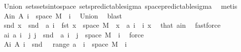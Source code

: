 \begin{isabellebody}
\ Union{\isacharparenleft}{\kern0pt}{}{\isacharparenright}{\kern0pt}\ sets{\isachardot}{\kern0pt}sets{\isacharunderscore}{\kern0pt}into{\isacharunderscore}{\kern0pt}space\ sets{\isacharunderscore}{\kern0pt}predictable{\isacharunderscore}{\kern0pt}sigma\ space{\isacharunderscore}{\kern0pt}predictable{\isacharunderscore}{\kern0pt}sigma\ \isamarkupfalse%
\ metis\isanewline
\ \ \isamarkupfalse%
\ A{\isacharunderscore}{\kern0pt}in{\isacharcolon}{\kern0pt}\ {\isachardoublequoteopen}A\ i\ {\isasymsubseteq}\ space\ M{\isachardoublequoteclose}\ \ i\ \isamarkupfalse%
\ Union{\isacharparenleft}{\kern0pt}{}{\isacharparenright}{\kern0pt}\ \isamarkupfalse%
\ blast\isanewline
\ \ \isamarkupfalse%
\ {\isachardoublequoteopen}snd\ x\ {\isasymin}\ snd\ {\isacharbackquote}{\kern0pt}\ {\isacharparenleft}{\kern0pt}a\ i\ {\isasyminter}\ {\isacharparenleft}{\kern0pt}{\isacharbraceleft}{\kern0pt}fst\ x{\isacharbraceright}{\kern0pt}\ {\isasymtimes}\ space\ M{\isacharparenright}{\kern0pt}{\isacharparenright}{\kern0pt}{\isachardoublequoteclose}\ \ {\isachardoublequoteopen}x\ {\isasymin}\ a\ i{\isachardoublequoteclose}\ \ i\ x\ \isamarkupfalse%
\ that\ a{\isacharunderscore}{\kern0pt}in\ \isamarkupfalse%
\ fastforce\isanewline
\ \ \isamarkupfalse%
\ a{\isacharunderscore}{\kern0pt}i{\isacharcolon}{\kern0pt}\ {\isachardoublequoteopen}a\ i\ {\isacharequal}{\kern0pt}\ {\isacharparenleft}{\kern0pt}{\isasymUnion}j{\isachardot}{\kern0pt}\ {\isacharbraceleft}{\kern0pt}j{\isacharbraceright}{\kern0pt}\ {\isasymtimes}\ {\isacharparenleft}{\kern0pt}snd\ {\isacharbackquote}{\kern0pt}\ {\isacharparenleft}{\kern0pt}a\ i\ {\isasyminter}\ {\isacharparenleft}{\kern0pt}{\isacharbraceleft}{\kern0pt}j{\isacharbraceright}{\kern0pt}\ {\isasymtimes}\ space\ M{\isacharparenright}{\kern0pt}{\isacharparenright}{\kern0pt}{\isacharparenright}{\kern0pt}{\isacharparenright}{\kern0pt}{\isachardoublequoteclose}\ \ i\ \isamarkupfalse%
\ force\isanewline
\ \ \isamarkupfalse%
\ A{\isacharunderscore}{\kern0pt}i{\isacharcolon}{\kern0pt}\ {\isachardoublequoteopen}A\ i\ {\isacharequal}{\kern0pt}\ snd\ {\isacharbackquote}{\kern0pt}\ {\isacharparenleft}{\kern0pt}{\isasymUnion}\ {\isacharparenleft}{\kern0pt}range\ a{\isacharparenright}{\kern0pt}\ {\isasyminter}\ {\isacharparenleft}{\kern0pt}{\isacharbraceleft}{\kern0pt}i{\isacharbraceright}{\kern0pt}\ {\isasymtimes}\ space\ M{\isacharparenright}{\kern0pt}{\isacharparenright}{\kern0pt}{\isachardoublequoteclose}\ \ i\ \isamarkupfalse%

\end{isabellebody}
